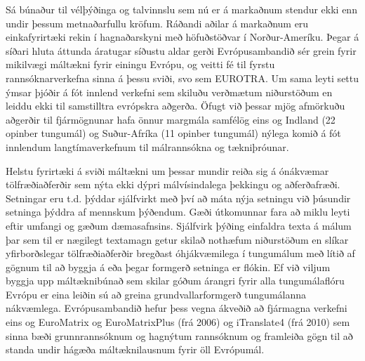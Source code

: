 \documentclass{../../metanetpaper}
\begin{document}
\begin{multicols}{2}
Sá búnaður til vélþýðinga og talvinnslu sem nú er á markaðnum stendur ekki enn undir þessum metnaðarfullu kröfum. Ráðandi aðilar á markaðnum eru einkafyrirtæki rekin í hagnaðarskyni með höfuðstöðvar í Norður-Ameríku. Þegar á síðari hluta áttunda áratugar síðustu aldar gerði Evrópusambandið sér grein fyrir mikilvægi máltækni fyrir einingu Evrópu, og veitti fé til fyrstu rannsóknarverkefna sinna á þessu sviði, svo sem EUROTRA. Um sama leyti settu ýmsar þjóðir á fót innlend verkefni sem skiluðu verðmætum niðurstöðum en leiddu ekki til samstilltra evrópskra aðgerða. Öfugt við þessar mjög afmörkuðu aðgerðir til fjármögnunar hafa önnur margmála samfélög eins og Indland (22 opinber tungumál) og Suður-Afríka (11 opinber tungumál) nýlega komið á fót innlendum langtímaverkefnum til málrannsókna og tækniþróunar.

Helstu fyrirtæki á sviði máltækni um þessar mundir reiða sig á ónákvæmar tölfræðiaðferðir sem nýta ekki dýpri málvísindalega þekkingu og aðferðafræði. Setningar eru t.d. þýddar sjálfvirkt með því að máta nýja setningu við þúsundir setninga þýddra af mennskum þýðendum. Gæði útkomunnar fara að miklu leyti eftir umfangi og gæðum dæmasafnsins. Sjálfvirk þýðing einfaldra texta á málum þar sem til er nægilegt textamagn getur skilað nothæfum niðurstöðum en slíkar yfirborðslegar tölfræðiaðferðir bregðast óhjákvæmilega í tungumálum með lítið af gögnum til að byggja á eða þegar formgerð setninga er flókin. Ef við viljum byggja upp máltæknibúnað sem skilar góðum árangri fyrir alla tungumálaflóru Evrópu er eina leiðin sú að greina grundvallarformgerð tungumálanna nákvæmlega. Evrópusambandið hefur þess vegna ákveðið að fjármagna verkefni eins og EuroMatrix og EuroMatrixPlus (frá 2006) og iTranslate4 (frá 2010) sem sinna bæði grunnrannsóknum og hagnýtum rannsóknum og framleiða gögn til að standa undir hágæða máltæknilausnum fyrir öll Evrópumál. 


\end{multicols}
\end{document}
